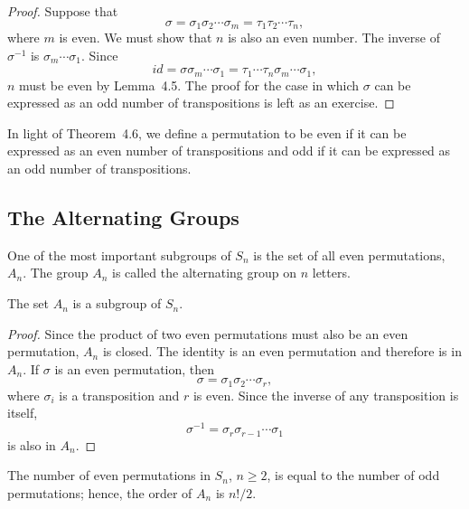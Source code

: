  
\begin{proof}
Suppose that
$$
\sigma = \sigma_1 \sigma_2 \cdots \sigma_m = \tau_1 \tau_2 \cdots
\tau_n, 
$$
where $m$ is even. We must show that $n$ is also an even number.  The
inverse of $\sigma^{-1}$ is $\sigma_m \cdots \sigma_1$. Since 
$$
id = \sigma \sigma_m \cdots \sigma_1
= \tau_1  \cdots \tau_n \sigma_m \cdots \sigma_1,
$$
$n$ must be even by Lemma~4.5.  The proof for the case in which
$\sigma$ can be expressed as an odd number of transpositions is left
as an exercise.  
\end{proof}
 
 
\vspace{2ex}
 
 
In light of Theorem~4.6, we define a permutation to be {\bfi
even} if  
it can be expressed as an even number of transpositions and {\bfi
odd}  
if it can be expressed as an odd number of transpositions.
 
 
\subsection*{The Alternating Groups}
 
 
One of the most important subgroups of $S_n$ is the set of
all even permutations, $A_n$\label{alternatinggroup}.  The group $A_n$ is called the {\bfi
alternating group on $n$ letters}. 
 
 
\begin{theorem}
The set $A_n$ is a subgroup of $S_n$.
\end{theorem}
 
 
\begin{proof}
Since the product of two even permutations must also be an even
permutation, $A_n$ is closed.  The identity is an even permutation and
therefore is in $A_n$. If $\sigma$ is an even permutation, then
$$
\sigma = \sigma_1 \sigma_2 \cdots \sigma_r,
$$
where $\sigma_i$ is a transposition and $r$ is even. Since the inverse
of any transposition is itself, 
$$
\sigma^{-1} = \sigma_r \sigma_{r-1} \cdots \sigma_1
$$
is also in $A_n$.
\end{proof}
 
 
\begin{proposition}
The number of even permutations in $S_n$, $n \geq 2$, is equal to the
number of odd permutations; hence, the order of $A_n$ is $n!/2$.
\end{proposition}
 
